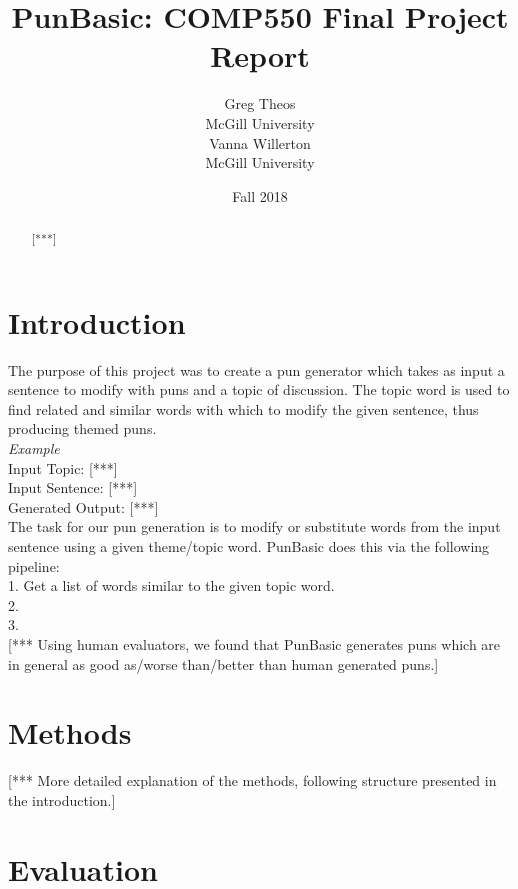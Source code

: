 \documentclass[11pt,letterpaper]{article}
\title{PunBasic: COMP550 Final Project Report}
\author{Greg Theos\\
    McGill University\\
	  \And
	Vanna Willerton\\
	McGill University\\}
\date{Fall 2018}
\begin{document}
\maketitle

\begin{abstract}
 [***]
\end{abstract}

\section{Introduction}

The purpose of this project was to create a pun generator which takes as input a sentence to modify with puns and a topic of discussion. The topic word is used to find related and similar words with which to modify the given sentence, thus producing themed puns. \\

\textit{Example}\\
Input Topic: [***] \\
Input Sentence: [***] \\
Generated Output: [***] \\

The task for our pun generation is to modify or substitute words from the input sentence using a given theme/topic word. PunBasic does this via the following pipeline:\\
1. Get a list of words similar to the given topic word.\\
2. \\
3. \\

[*** Using human evaluators, we found that PunBasic generates puns which are in general as good as/worse than/better than human generated puns.]

\section{Methods}

[*** More detailed explanation of the methods, following structure presented in the introduction.]

\section{Evaluation}
\end{document}
